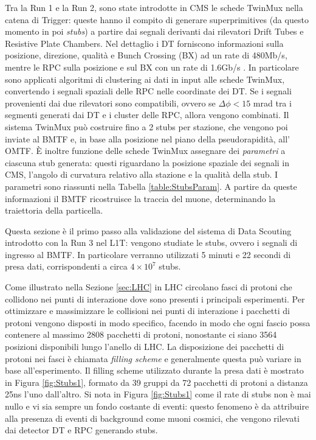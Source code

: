 Tra la Run 1 e la Run 2, sono state introdotte in CMS le schede TwinMux nella catena di Trigger: queste hanno il compito di generare superprimitives (da questo momento in poi \textit{stubs}) a partire dai segnali derivanti dai rilevatori Drift Tubes e Resistive Plate Chambers. \newline
Nel dettaglio i DT forniscono informazioni sulla posizione, direzione, qualità e Bunch Crossing (BX) ad un rate di 480Mb/s, mentre le RPC sulla posizione e sul BX con un rate di 1.6Gb/s \cite{CERNsummerSchool}.\newline
In particolare sono applicati algoritmi di clustering ai dati in input alle schede TwinMux, convertendo i segnali spaziali delle RPC nelle coordinate dei DT. Se i segnali provenienti dai due rilevatori sono compatibili, ovvero se $\Delta \phi < 15$ \si{mrad} tra i segmenti generati dai DT e i cluster delle RPC, allora vengono combinati.
Il sistema TwinMux può costruire fino a 2 stubs per stazione, che vengono poi inviate al BMTF e, in base alla posizione nel piano della pseudorapidità, all' OMTF. \newline
È inoltre funzione delle schede TwinMux assegnare dei \textit{parametri} a ciascuna stub generata: questi riguardano la posizione spaziale dei segnali in CMS, l'angolo di curvatura relativo alla stazione e la qualità della stub. I parametri sono riassunti nella Tabella \ref{table:StubsParam}. A partire da queste informazioni il BMTF ricostruisce la traccia del muone, determinando la traiettoria della particella. 

Questa sezione è il primo passo alla validazione del sistema di Data Scouting introdotto con la Run 3 nel L1T: vengono studiate le stubs, ovvero i segnali di ingresso al BMTF. In particolare verranno utilizzati 5 minuti e 22 secondi di presa dati, corrispondenti a circa $4 \times 10^{7}$ stubs. 

Come illustrato nella Sezione \ref{sec:LHC} in LHC circolano fasci di protoni che collidono nei punti di interazione dove sono presenti i principali esperimenti. Per ottimizzare e massimizzare le collisioni nei punti di interazione i pacchetti di protoni vengono disposti in modo specifico, facendo in modo che ogni fascio possa contenere al massimo 2808 pacchetti di protoni, nonostante ci siano 3564 posizioni disponibili lungo l'anello di LHC. La disposizione dei pacchetti di protoni nei fasci è chiamata \textit{filling scheme} e generalmente questa può variare in base all'esperimento. Il filling scheme utilizzato durante la presa dati è mostrato in Figura \ref{fig:Stubs1}, formato da 39 gruppi da 72 pacchetti di protoni a distanza 25ns l'uno dall'altro\cite{Bailey}. \newline
Si nota in Figura \ref{fig:Stubs1} come il rate di stubs non è mai nullo e vi sia sempre un fondo costante di eventi: questo fenomeno è da attribuire alla presenza di eventi di background come muoni cosmici, che vengono rilevati dai detector DT e RPC generando stubs. 



